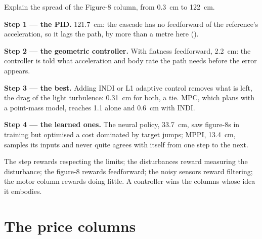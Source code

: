 
\begin{example}
\label{ex:arena-eight}
Explain the spread of the Figure-8 column, from \SI{0.3}{cm} to \SI{122}{cm}.

\textbf{Step 1 — the PID.} \SI{121.7}{cm}: the cascade has no feedforward of the reference's acceleration, so it lags the path, by more than a metre here ().

\textbf{Step 2 — the geometric controller.} With flatness feedforward, \SI{2.2}{cm}: the controller is told what acceleration and body rate the path needs before the error appears.

\textbf{Step 3 — the best.} Adding INDI or L1 adaptive control removes what is left, the drag of the light turbulence: \SI{0.31}{cm} for both, a tie. MPC, which plans with a point-mass model, reaches 1.1 alone and \SI{0.6}{cm} with INDI.

\textbf{Step 4 — the learned ones.} The neural policy, \SI{33.7}{cm}, saw figure-8s in training but optimised a cost dominated by target jumps; MPPI, \SI{13.4}{cm}, samples its inputs and never quite agrees with itself from one step to the next.
\end{example}

\begin{keyidea}
The step rewards respecting the limits; the disturbances reward measuring the disturbance; the figure-8 rewards feedforward; the noisy sensors reward filtering; the motor column rewards doing little. A controller wins the columns whose idea it embodies.
\end{keyidea}

\section{The price columns}

